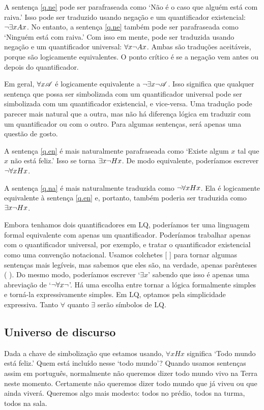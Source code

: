 A sentença \ref{q.ne} pode ser parafraseada como `Não é o caso que alguém está com raiva.' Isso pode ser traduzido usando negação e um quantificador existencial: $\neg \exists x Ax$. No entanto, a sentença \ref{q.ne} também pode ser parafraseada como `Ninguém está com raiva.' Com isso em mente, pode ser traduzida usando negação e um quantificador universal: $\forall x \neg Ax$. Ambas são traduções aceitáveis, porque são logicamente equivalentes. O ponto crítico é se a negação vem antes ou depois do quantificador.

Em geral, $\forall x\mathscr{A}$ é logicamente equivalente a $\neg\exists x\neg\mathscr{A}$. Isso significa que qualquer sentença que possa ser simbolizada com um quantificador universal pode ser simbolizada com um quantificador existencial, e vice-versa. Uma tradução pode parecer mais natural que a outra, mas não há diferença lógica em traduzir com um quantificador ou com o outro. Para algumas sentenças, será apenas uma questão de gosto.

A sentença \ref{q.en} é mais naturalmente parafraseada como `Existe algum $x$ tal que $x$ não está feliz.' Isso se torna $\exists x \neg Hx$. De modo equivalente, poderíamos escrever $\neg\forall x Hx$.

A sentença \ref{q.na} é mais naturalmente traduzida como $\neg\forall xHx$. Ela é logicamente equivalente à sentença \ref{q.en} e, portanto, também poderia ser traduzida como $\exists x \neg Hx$.

Embora tenhamos dois quantificadores em LQ, poderíamos ter uma linguagem formal equivalente com apenas um quantificador. Poderíamos trabalhar apenas com o quantificador universal, por exemplo, e tratar o quantificador existencial como uma convenção notacional. Usamos colchetes [ ] para tornar algumas sentenças mais legíveis, mas sabemos que eles são, na verdade, apenas parênteses ( ). Do mesmo modo, poderíamos escrever `$\exists x$' sabendo que isso é apenas uma abreviação de `$\neg \forall x \neg$'. Há uma escolha entre tornar a lógica formalmente simples e torná-la expressivamente simples. Em LQ, optamos pela simplicidade expressiva. Tanto $\forall$ quanto $\exists$ serão símbolos de LQ.


\subsection{Universo de discurso}
Dada a chave de simbolização que estamos usando, $\forall xHx$ significa `Todo mundo está feliz.' Quem está incluído nesse `todo mundo'? Quando usamos sentenças assim em português, normalmente não queremos dizer todo mundo vivo na Terra neste momento. Certamente não queremos dizer todo mundo que já viveu ou que ainda viverá. Queremos algo mais modesto: todos no prédio, todos na turma, todos na sala.

